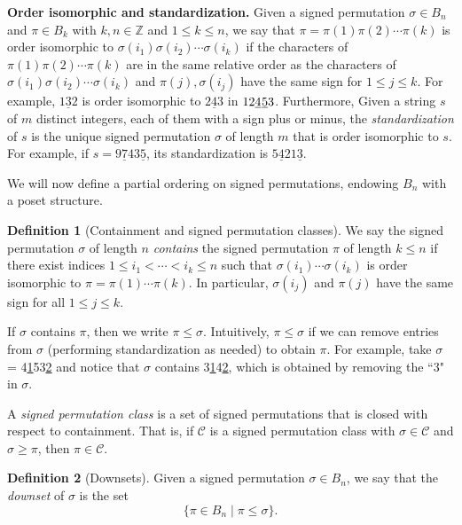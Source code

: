 \documentclass{article}
\numberwithin{equation}{section}
\theoremstyle{definition}
\newtheorem{defn}{Definition}[section]
\begin{document}
\textbf{Order isomorphic and standardization.} Given a signed permutation $\sigma\in B_n$ and $\pi\in B_k$ with $k,n\in\mathbb{Z}$ and $1\leq k\leq n$, we say that $\pi=\pi(1)\pi(2)\cdots\pi(k)$ is order isomorphic to $\sigma(i_1)\sigma(i_2)\cdots\sigma(i_k)$ if the characters of $\pi(1)\pi(2)\cdots\pi(k)$ are in the same relative order as the characters of $\sigma(i_1)\sigma(i_2)\cdots\sigma(i_k)$ and $\pi(j),\sigma(i_j)$ have the same sign for $1\leq j\leq k$. For example, $1\underline{3}2$ is order isomorphic to $2\underline{4}3$ in $12\underline{4}\hspace{0.02cm}\underline{5}3$. Furthermore, Given a string $s$ of $m$ distinct integers, each of them with a sign plus or minus, the \emph{standardization} of $s$ is the unique signed permutation $\sigma$ of length $m$ that is order isomorphic to $s$. For example, if $s=9\underline{7}43\underline{5}$, its standardization is $5\underline{4}21\underline{3}$.

We will now define a partial ordering on signed permutations, endowing $B_n$ with a poset structure.

\begin{defn}[Containment and signed permutation classes]
    We say the signed permutation $\sigma$ of length $n$ \emph{contains} the signed permutation $\pi$ of length $k\leq n$ if there exist indices $1 \leq i_1 < \cdots < i_k \leq n$ such that $\sigma(i_1)\cdots \sigma(i_k)$ is order isomorphic to $\pi=\pi(1)\cdots\pi(k)$. In particular, $\sigma(i_j)$ and $\pi(j)$ have the same sign for all $1\leq j\leq k$.
\end{defn}
If $\sigma$ contains $\pi$, then we write $\pi\leq\sigma$. Intuitively, $\pi\leq\sigma$ if we can remove entries from $\sigma$ (performing standardization as needed) to obtain $\pi$. For example, take $\sigma$ = 4\underline{1}53\underline{2} and notice that $\sigma$ contains 3\underline{1}4\underline{2}, which is obtained by removing the ``3" in $\sigma$.

 A \emph{signed permutation class} is a set of signed permutations that is closed with respect to containment. That is, if $\mathcal{C}$ is a signed permutation class with $\sigma\in \mathcal{C}$ and $\sigma\geq\pi$, then $\pi\in\mathcal{C}$.
 

\begin{defn}[Downsets]
Given a signed permutation $\sigma\in B_n$, we say that the \emph{downset} of $\sigma$ is the set
\[
\{\pi\in B_n\mid \pi\leq\sigma\}.
\]
\end{defn}
\end{document}
